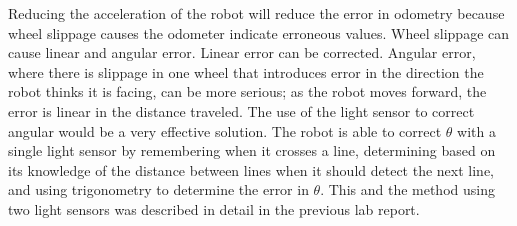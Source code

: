 \documentclass[twocolumn]{article}
\begin{document}
Reducing the acceleration of the robot will reduce the error in odometry because wheel slippage causes the odometer indicate erroneous values.
Wheel slippage can cause linear and angular error. Linear error
can be corrected. Angular error, where there is slippage in one wheel that introduces error in the direction the robot thinks it is facing, can be more serious; as the robot moves forward, the error is linear in the distance traveled.
The use of the light sensor to correct angular would be a very effective solution. The robot is able to correct $\theta$ with a single light sensor by remembering when it crosses a line, determining based on its knowledge of the distance between lines when it should detect the next line, and using trigonometry to determine the error in $\theta$. This and the method using two light sensors was described in detail in the previous lab report\cite{alexneil2}.


\end{document}
